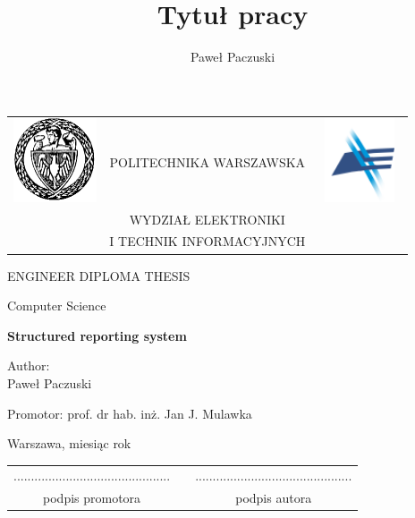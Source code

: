 \documentclass[12pt, twoside, openany]{report}
\author{Paweł Paczuski}
\title{Tytuł pracy}
\theoremstyle{definition}
\begin{document}
\begin{titlepage}
\pagestyle{empty}

\noindent
\begin{Large}
\begin{table}[t]
\centering
\begin{tabular}[t]{lcr}
 \includegraphics[width=70pt,height=70pt]{PW} & POLITECHNIKA WARSZAWSKA & \includegraphics[width=70pt,height=70pt]{ELKA}\\
& WYDZIAŁ ELEKTRONIKI & \\
& I TECHNIK INFORMACYJNYCH &
\end{tabular}
\end{table}

\begin{center}ENGINEER DIPLOMA THESIS\end{center}
\begin{center}Computer Science\end{center}\end{Large}
\begin{center}
\Huge
\textbf{Structured reporting system}
\end{center}
\vfill
\begin{center}
\Large
Author:\\
\LARGE
Paweł Paczuski
\end{center}
\vfill
\begin{center}
\Large
Promotor: prof. dr hab. inż. Jan J. Mulawka
\end{center}
\vfill
\begin{center}
\Large
Warszawa, miesiąc rok
\end{center}
\newpage
\hfill
\begin{table}[b]
\centering
\begin{tabular}[t]{ccc}
............................................. & \hspace*{100pt} & .............................................\\
podpis promotora & \hspace*{100pt} & podpis autora
\end{tabular}
\end{table}


\end{titlepage}
\end{document}
